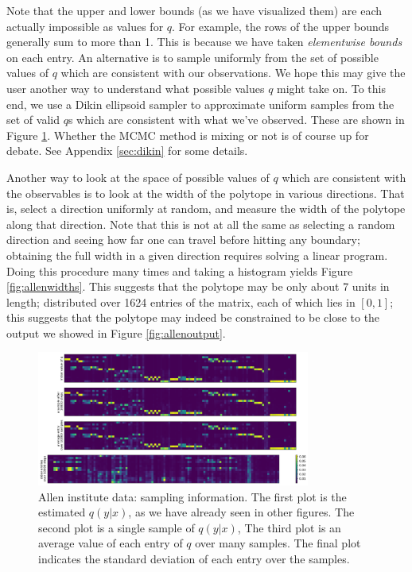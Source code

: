 Note that the upper and lower bounds (as we have visualized them) are each actually impossible as values for $q$.  For example, the rows of the upper bounds generally sum to more than 1.  This is because we have taken \emph{elementwise bounds} on each entry.  An alternative is to  sample uniformly from the set of possible values of $q$ which are consistent with our observations.  We hope this may give the user another way to understand what possible values $q$ might take on.  To this end, we use a Dikin ellipsoid sampler to approximate uniform samples from the set of valid $q$s which are consistent with what we've observed.  These are shown in Figure \ref{fig:allenavg}.  Whether the MCMC method is mixing or not is of course up for debate.  See Appendix \ref{sec:dikin} for some details.

Another way to look at the space of possible values of $q$ which are consistent with the observables is to look at the width of the polytope in various directions.  That is, select a direction uniformly at random, and measure the width of the polytope along that direction.  Note that this is not at all the same as selecting a random direction and seeing how far one can travel before hitting any boundary; obtaining the full width in a given direction requires solving a linear program.  Doing this procedure many times and taking a histogram yields Figure \ref{fig:allenwidths}.  This suggests that the polytope may be only about 7 units in length; distributed over 1624 entries of the matrix, each of which lies in $[0,1]$; this suggests that the polytope may indeed be  constrained to be close to the output we showed in Figure \ref{fig:allenoutput}.

\begin{figure}
\includegraphics[width=0.8\textwidth]{pics/allenavg}
\caption{Allen institute data: sampling information.  The first plot is the estimated $q(y|x)$, as we have already seen in other figures.  The second plot is a single sample of $q(y|x)$,  The third plot is an average value of each entry of $q$ over many samples.  The final plot indicates the standard deviation of each entry over the samples. \label{fig:allenavg}}
\end{figure}

